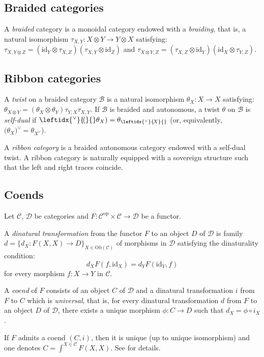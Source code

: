 \documentclass[a4paper]{amsart}
\theoremstyle{definition}
\newcommand{\co}{\colon}
\newcommand{\id}{\mathrm{id}}
\newcommand{\opp}{\mathrm{op}}
\newcommand{\cc}{\mathcal{C}}
\newcommand{\bb}{\mathcal{B}}
\newcommand{\dd}{\mathcal{D}}
\newcommand{\Ob}{\mathrm{Ob}}
\newcommand{\ldual}[1]{\leftidx{^\vee}{\!#1}{}}
\newcommand{\rdual}[1]{{#1}^\vee}
\begin{document}
\subsection{Braided categories}
A \emph{braided} category is a monoidal category endowed with a \emph{braiding}, that is, a natural  isomorphism $\tau_{X,Y} \co X \otimes Y \to Y \otimes X$ satisfying: $\tau_{X,Y\otimes Z}=(\id_Y \otimes \tau_{X,Z})(\tau_{X,Y} \otimes \id_Z)$ and $\tau_{X
\otimes Y,Z}=(\tau_{X,Z} \otimes \id_Y)(\id_X \otimes \tau_{Y,Z})$.

\subsection{Ribbon categories}
A \emph{twist} on a braided category $\bb$ is a natural isomorphism $\theta_X \co X \to X$
satisfying: $\theta_{X\otimes Y}=(\theta_X \otimes \theta_Y)\tau_{Y,X}\tau_{X,Y}$. If $\bb$ is braided and autonomous, a
twist $\theta$ on $\bb$ is \emph{self-dual} if $\ldual{(}\theta_X)=\theta_{\ldual{X}}$ (or, equivalently,
$(\theta_X\rdual{)}=\theta_{\rdual{X}}$).

A \emph{ribbon category} is a braided autonomous category endowed with a self-dual twist. A ribbon category is naturally equipped with a sovereign structure such that the left and right traces coincide.


\subsection{Coends}\label{sect-coend}
Let $\cc$, $\dd$ be categories and $F\co \cc^\opp \times \cc \to \dd$ be a functor.

A \emph{dinatural transformation} from the functor $F$ to an object $D$ of $\dd$  is family $d=\{d_X \co F(X,X) \to D\}_{X \in
\Ob(\cc)}$ of morphisms in $\dd$ satisfying the dinaturality condition:
\begin{equation*}
d_X F(f, \id_X)=d_Y F(\id_Y,f)
\end{equation*}
for every morphism $f\co X \to Y$ in $\cc$.

A \emph{coend} of $F$  consists of an object $C$ of $\dd$ and a dinatural
transformation $i$ from $F$ to $C$ which is \emph{universal}, that is, for every dinatural transformation $d$ from $F$ to an object $D$ of $\dd$, there exists a unique morphism $\phi\co C \to D$ such that $d_X=\phi \circ i_X$.

If $F$ admits a coend $(C,i)$, then it is unique (up to unique isomorphism) and one denotes $C=\int^{X\in \cc} F(X,X)$. See \cite{ML1} for details.
\end{document}
